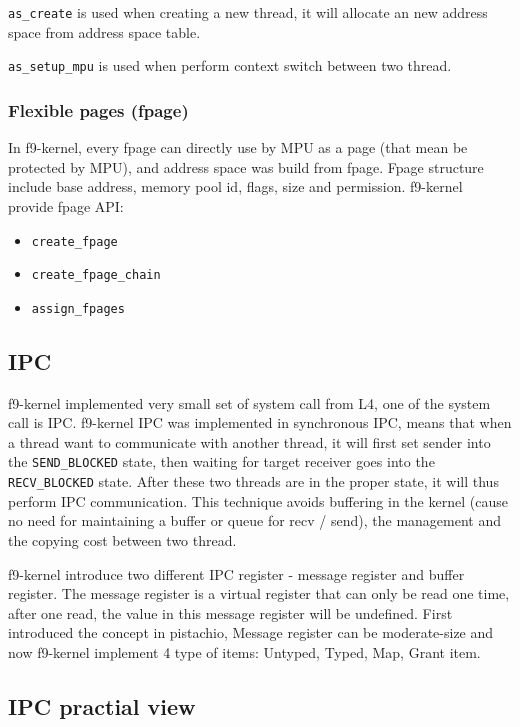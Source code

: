 \documentclass[10pt,preprint,nocopyrightspace]{sigplanconf}
\begin{document}
\verb|as_create| is used when creating a new thread, it will allocate an new address space from address space table.

\verb|as_setup_mpu| is used when perform context switch between two thread.


\subsubsection{Flexible pages (fpage)}
In f9-kernel, every fpage can directly use by MPU as a page (that mean be protected by MPU), and address space was build from fpage. Fpage structure include base address, memory pool id, flags, size and permission. f9-kernel provide fpage API:
\begin{itemize}
	\item \verb|create_fpage|
	\item \verb|create_fpage_chain|
	\item \verb|assign_fpages|
\end{itemize}

\subsection{IPC}

f9-kernel implemented very small set of system call from L4, one of the system call is IPC\cite{dannowski2011l4, arm2016svc}. f9-kernel IPC was implemented in synchronous IPC, means that when a thread want to communicate with another thread, it will first set sender into the \verb|SEND_BLOCKED| state, then waiting for target receiver goes into the \verb|RECV_BLOCKED| state. After these two threads are in the proper state, it will thus perform IPC communication. This technique avoids buffering in the kernel (cause no need for maintaining a buffer or queue for recv / send), the management and the copying cost between two thread.\cite{nourai2005aphysically}

f9-kernel introduce two different IPC register - message register and buffer register. The message register is a virtual register that can only be read one time, after one read, the value in this message register will be undefined. First introduced the concept in pistachio\cite{nourai2005aphysically}, Message register can be moderate-size and now f9-kernel implement 4 type of items: Untyped, Typed, Map, Grant item.

\subsection{IPC practial view}
\end{document}
